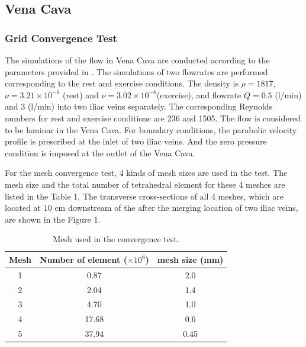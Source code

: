 \subsection{Vena Cava}

\subsubsection*{Grid Convergence Test}

The simulations of the flow in Vena Cava are conducted according to the parameters provided in \cite{craven_cfd}. The simulations of two flowrates are performed corresponding to the rest and exercise conditions. The density is $\rho=1817$, $\nu=3.21\times10^{-6}$ (rest) and $\nu=3.02\times10^{-6}$(exercise), and flowrate $Q= 0.5$ (l/min) and $3$ (l/min) into two iliac veins separately. The corresponding Reynolds numbers for rest and exercise conditions are 236 and 1505. The flow is considered to be laminar in the Vena Cava.
For boundary conditions, the parabolic velocity profile is prescribed at the inlet of two iliac veins. And the zero pressure condition is imposed at the outlet of the Vena Cava. 

For the mesh convergence test, 4 kinds of mesh sizes are used in the test. The mesh size and the total number of tetrahedral element for these 4 meshes are listed in the Table 1. The transverse cross-sections of all 4 meshes, which are located at 10 cm downstream of the after the merging location of two iliac veins, are shown in the Figure 1.

\begin{table}[h]
\caption {Mesh used in the convergence test.} \label{tab:meshsize}
\centering
\begin{tabular}{|c|c|c|}
\hline
Mesh & Number of element ($\times10^6$)& mesh size (mm) \\ \hline
1    & 0.87              & 2.0              \\ \hline
2    & 2.04              & 1.4            \\ \hline
3    & 4.70              & 1.0               \\ \hline
4    & 17.68             & 0.6            \\ \hline
5    & 37.94             & 0.45            \\ \hline
\end{tabular}
\end{table}


